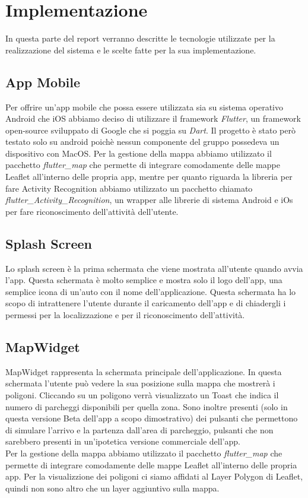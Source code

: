 \documentclass[../../Report.tex]{subfiles}
\begin{document}
\chapter{Implementazione}
\label{chap:Implementazione}
In questa parte del report verranno descritte le tecnologie utilizzate per la realizzazione del sistema e le scelte fatte per la sua implementazione.\\

\section{App Mobile}
    Per offrire un'app mobile che possa essere utilizzata sia su sistema operativo Android che iOS abbiamo deciso di utilizzare il framework \emph{Flutter}, un framework open-source sviluppato di Google che si poggia su \emph{Dart}. Il progetto è stato però testato solo su android poichè nessun componente del gruppo possedeva un dispositivo con MacOS. Per la gestione della mappa abbiamo utilizzato il pacchetto \emph{flutter\_map} che permette di integrare comodamente delle mappe Leaflet all'interno delle propria app, mentre per quanto riguarda la libreria per fare Activity Recognition abbiamo utilizzato un pacchetto chiamato \emph{flutter\_Activity\_Recognition}, un wrapper alle librerie di sistema Android e iOs per fare riconoscimento dell'attività dell'utente. \\
\section{Splash Screen}
Lo splash screen è la prima schermata che viene mostrata all'utente quando avvia l'app. Questa schermata è molto semplice e mostra solo il logo dell'app, una semplice icona di un'auto con il nome dell'applicazione. Questa schermata ha lo scopo di intrattenere l'utente durante il caricamento dell'app e di chiadergli i permessi per la localizzazione e per il riconoscimento dell'attività.\\

\section{MapWidget}
MapWidget rappresenta la schermata principale dell'applicazione. In questa schermata l'utente può vedere la sua posizione sulla mappa che mostrerà i poligoni. Cliccando su un poligono verrà visualizzato un Toast che indica il numero di parcheggi disponibili per quella zona. Sono inoltre presenti (solo in questa versione Beta dell'app a scopo dimostrativo) dei pulsanti che permettono di simulare l'arrivo e la partenza dall'area di parcheggio, pulsanti che non sarebbero presenti in un'ipotetica versione commerciale dell'app. \\ 
Per la gestione della mappa abbiamo utilizzato il pacchetto \emph{flutter\_map} che permette di integrare comodamente delle mappe Leaflet all'interno delle propria app. Per la visualizzione dei poligoni ci siamo affidati al Layer Polygon di Leaflet, quindi non sono altro che un layer aggiuntivo sulla mappa.\\ 
\end{document}
